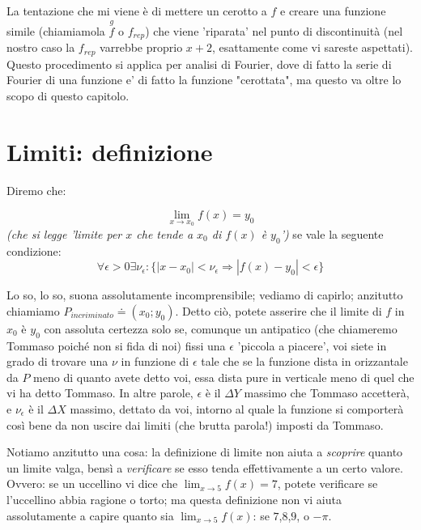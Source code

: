 La tentazione che mi viene è di mettere un cerotto a $f$ e creare una funzione simile (chiamiamola $\stackrel{g}{f}$ o $f_{rep}$)
che viene 'riparata' nel punto di discontinuità (nel nostro caso la $f_{rep}$ varrebbe proprio $x+2$, esattamente come vi sareste
aspettati). Questo procedimento si applica per analisi di Fourier, dove di fatto la serie di Fourier di una funzione e' di fatto
la funzione "cerottata", ma questo va oltre lo scopo di questo capitolo.

\section{Limiti: definizione}

Diremo che:

\begin{equation}
\lim_{x \to x_0} f(x) = y_{0}
\end{equation}
{\em (che si legge 'limite per $x$ che tende a $x_0$ di $f(x)$ è $y_0$')} se vale la seguente condizione:
\begin{equation}\label{definizionelimite}
\forall \epsilon >0 \exists \nu_\epsilon : \{ |x-x_0|<\nu_\epsilon \Longrightarrow  |f(x)-y_0|<\epsilon   \}
\end{equation}

Lo so, lo so, suona assolutamente incomprensibile; vediamo di capirlo; anzitutto chiamiamo $P_{incriminato} \doteq (x_0;y_0)$.
Detto ciò, potete asserire che il limite di $f$ in $x_0$ è $y_0$ con assoluta certezza solo se, comunque un antipatico (che
chiameremo Tommaso poiché non si fida di noi) fissi una $\epsilon$ 'piccola a piacere', voi siete in grado di trovare una
$\nu$ in funzione di $\epsilon$ tale che se la funzione dista in orizzantale da $P$ meno di quanto avete detto voi, essa dista
pure in verticale meno di quel che vi ha detto Tommaso. In altre parole, $\epsilon$ è il $\Delta Y$ massimo che Tommaso accetterà,
e $\nu_\epsilon$ è il $\Delta X$ massimo, dettato da voi, intorno al quale la funzione si comporterà così bene da non uscire dai
limiti (che brutta parola!) imposti da Tommaso.

Notiamo anzitutto una cosa: la definizione di limite non aiuta a {\em scoprire} quanto un limite valga, bensì a {\em verificare}
se esso tenda effettivamente a un certo valore. Ovvero: se un uccellino vi dice che $\lim_{x \to 5} f(x)=7$, potete verificare
se l'uccellino abbia ragione o torto; ma questa definizione non vi aiuta assolutamente a capire quanto sia $\lim_{x \to 5} f(x)$:
se $7$,$8$,$9$, o $-\pi$.

